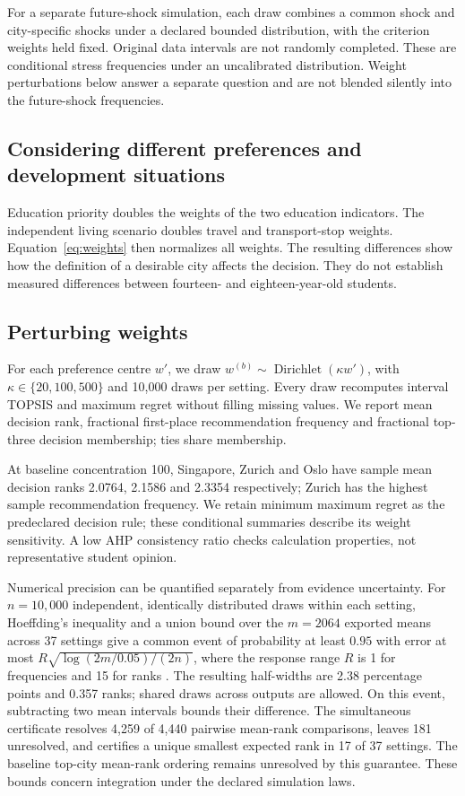 For a separate future-shock simulation, each draw combines a common shock and
city-specific shocks under a declared bounded distribution, with the criterion
weights held fixed. Original data intervals are not randomly completed.
\FutureMonteCarlo
\ProxyWithdrawalMC
These are conditional stress frequencies under an uncalibrated distribution.
Weight perturbations below answer a separate question and are not blended
silently into the future-shock frequencies.

\subsection{Considering different preferences and development situations}
Education priority doubles the weights of the two education indicators.
The independent living scenario doubles travel and transport-stop weights.
Equation~\ref{eq:weights} then normalizes all weights.
\PreferenceResults
\PreferenceEvidenceChange
The resulting differences show how the definition of a desirable city affects
the decision. They do not establish measured differences between fourteen- and
eighteen-year-old students.

\subsection{Perturbing weights}
For each preference centre $w'$, we draw
$w^{(b)}\sim\operatorname{Dirichlet}(\kappa w')$, with
$\kappa\in\{20,100,500\}$ and 10,000 draws per setting. Every draw recomputes
interval TOPSIS and maximum regret without filling missing values. We report
mean decision rank, fractional first-place recommendation frequency and
fractional top-three decision membership; ties share membership.





At baseline concentration 100, Singapore, Zurich and Oslo have sample mean
decision ranks 2.0764, 2.1586 and 2.3354 respectively; Zurich has the highest
sample recommendation frequency.
We retain minimum maximum regret as the predeclared decision rule; these
conditional summaries describe its weight sensitivity. A low AHP consistency
ratio checks calculation properties, not representative student opinion.

Numerical precision can be quantified separately from evidence uncertainty.
For $n=10{,}000$ independent, identically distributed draws within each setting,
Hoeffding's inequality and a union bound over the $m=2064$ exported means across
37 settings give a common event of probability at least $0.95$ with error
at most $R\sqrt{\log(2m/0.05)/(2n)}$, where the response range $R$ is 1 for
frequencies and 15 for ranks \cite{hoeffding}.
The resulting half-widths are 2.38 percentage points and 0.357 ranks;
shared draws across outputs are allowed. On this event, subtracting two mean
intervals bounds their difference. The simultaneous certificate resolves 4,259 of 4,440 pairwise mean-rank
comparisons, leaves 181 unresolved, and certifies a unique smallest expected
rank in 17 of 37 settings. The baseline top-city mean-rank ordering remains
unresolved by this guarantee. These bounds concern integration under the declared
simulation laws.

